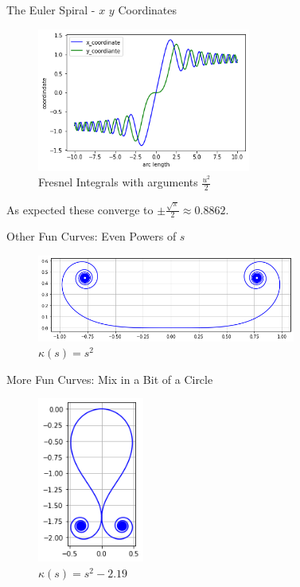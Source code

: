 \documentclass{beamer}
\begin{document}
\begin{frame}{The Euler Spiral - $x$ $y$ Coordinates}
	\begin{figure}
	\caption{Fresnel Integrals with arguments $\frac{u^2}{2}$}
	\centering
	\includegraphics[width=70mm, scale=0.5]{euler_x_vs_y.png}
	\end{figure}
	As expected these converge to $\pm \frac{\sqrt{\pi}}{2} \approx 0.8862$.
\end{frame}

\begin{frame}{Other Fun Curves: Even Powers of $s$}
	\begin{figure}
		\caption{$\kappa(s) = s^2$}
		\centering
		\includegraphics[width=85mm, scale=0.5]{chaise_longue.png}
	\end{figure}
\end{frame}

\begin{frame}{More Fun Curves: Mix in a Bit of a Circle}
	\begin{figure}
		\caption{$\kappa(s) = s ^ 2 -2.19$}
		\centering
		\includegraphics[width=35mm, scale=0.2]{s_squared_minus_219.png}
	\end{figure}
\end{frame}
\end{document}
